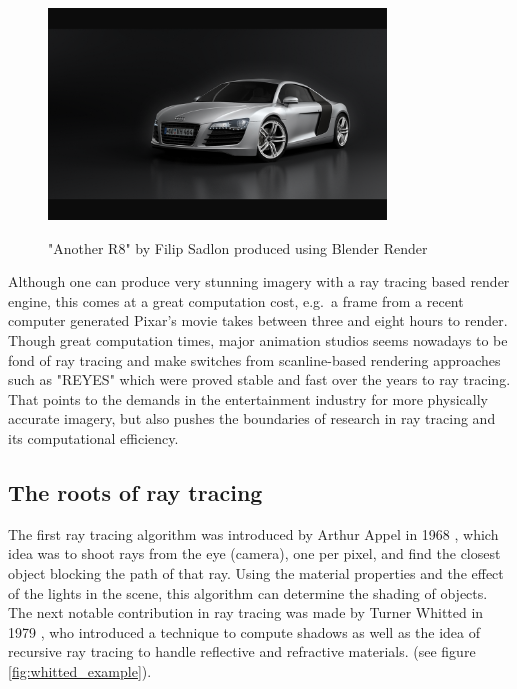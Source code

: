 \documentclass{article}
\begin{document}
\begin{figure}[h!]
    \caption{"Another R8" by Filip Sadlon produced using Blender Render}
    \includegraphics[width=0.8\textwidth]{audi}
    \label{fig:audi}
\end{figure}

Although one can produce very stunning imagery with a ray tracing based render engine, this  comes at a great computation cost, e.g.\ a frame from a recent computer generated Pixar's movie takes between three and eight hours to render. \cite{pixarRentime} \\
Though great computation times, major animation studios seems nowadays to be fond of ray tracing and make switches from scanline-based rendering approaches such as "REYES" which were proved stable and fast over the years to ray tracing. \cite{pixarSwitch} That points to the demands in the entertainment industry for more physically accurate imagery, but also pushes the boundaries of research in ray tracing and its computational efficiency. \cite{disneyHyperion}

\subsection{The roots of ray tracing}
The first ray tracing algorithm was introduced by Arthur Appel in 1968 \cite{appel}, which idea was to shoot rays from the eye (camera), one per pixel, and find the closest object blocking the path of that ray. Using the material properties and the effect of the lights in the scene, this algorithm can determine the shading of objects. \\
The next notable contribution in ray tracing was made by Turner Whitted in 1979 \cite{whitted}, who introduced a technique to compute shadows as well as the idea of recursive ray tracing to handle reflective and refractive materials. (see figure \ref{fig:whitted_example}).  
\end{document}
